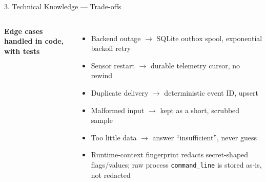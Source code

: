 \documentclass[aspectratio=169, 11pt]{beamer}
\begin{document}
\begin{frame}{3. Technical Knowledge --- Trade-offs}
\begin{columns}[T]
\footnotesize
\textbf{Edge cases handled in code, with tests}
\begin{itemize}\setlength\itemsep{1pt}
  \item Backend outage $\rightarrow$ SQLite outbox spool, exponential backoff retry
  \item Sensor restart $\rightarrow$ durable telemetry cursor, no rewind
  \item Duplicate delivery $\rightarrow$ deterministic event ID, upsert
  \item Malformed input $\rightarrow$ kept as a short, scrubbed sample
  \item Too little data $\rightarrow$ answer ``insufficient'', never guess
  \item Runtime-context fingerprint redacts secret-shaped flags/values;
        raw process \texttt{command\_line} is stored as-is, not redacted
\end{itemize}
\end{columns}
\end{frame}
\end{document}
